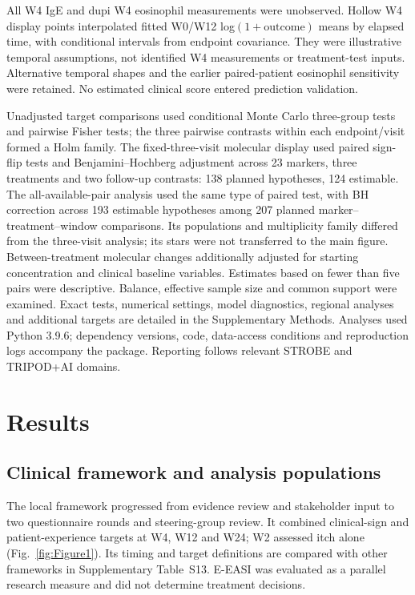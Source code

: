 \documentclass[10pt,a4paper]{article}
\begin{document}
All W4 IgE and dupi W4 eosinophil measurements were unobserved. Hollow W4 display points interpolated fitted W0/W12 log$(1+\mathrm{outcome})$ means by elapsed time, with conditional intervals from endpoint covariance. They were illustrative temporal assumptions, not identified W4 measurements or treatment-test inputs. Alternative temporal shapes and the earlier paired-patient eosinophil sensitivity were retained. No estimated clinical score entered prediction validation.

Unadjusted target comparisons used conditional Monte Carlo three-group tests and pairwise Fisher tests; the three pairwise contrasts within each endpoint/visit formed a Holm family. The fixed-three-visit molecular display used paired sign-flip tests and Benjamini--Hochberg adjustment across 23 markers, three treatments and two follow-up contrasts: 138 planned hypotheses, 124 estimable. The all-available-pair analysis used the same type of paired test, with BH correction across 193 estimable hypotheses among 207 planned marker--treatment--window comparisons. Its populations and multiplicity family differed from the three-visit analysis; its stars were not transferred to the main figure. Between-treatment molecular changes additionally adjusted for starting concentration and clinical baseline variables. Estimates based on fewer than five pairs were descriptive. Balance, effective sample size and common support were examined. Exact tests, numerical settings, model diagnostics, regional analyses and additional targets are detailed in the Supplementary Methods. Analyses used Python 3.9.6; dependency versions, code, data-access conditions and reproduction logs accompany the package. Reporting follows relevant STROBE and TRIPOD+AI domains.\citep{vonelm2007strobe,collins2024tripod}

\section{Results}
\subsection{Clinical framework and analysis populations}
The local framework progressed from evidence review and stakeholder input to two questionnaire rounds and steering-group review. It combined clinical-sign and patient-experience targets at W4, W12 and W24; W2 assessed itch alone (Fig.~\ref{fig:Figure1}). Its timing and target definitions are compared with other frameworks in Supplementary Table~S13. E-EASI was evaluated as a parallel research measure and did not determine treatment decisions.
\end{document}
